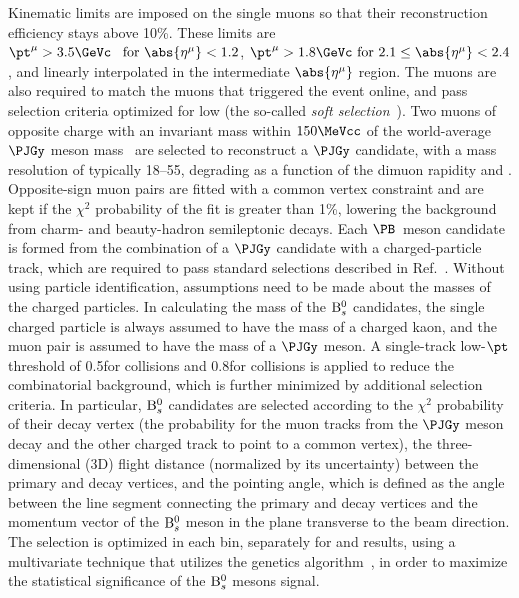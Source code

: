 Kinematic limits are imposed on the single muons so that their reconstruction efficiency stays above 10\%. These limits are $\pt^{\mu}>3.5\GeVc\enspace \text{ for } \abs{\eta^{\mu}}<1.2$, $\pt^{\mu}>1.8\GeVc\text{ for }2.1\le\abs{\eta^{\mu}}<2.4$, 
and linearly interpolated in the intermediate $\abs{\eta^{\mu}}$ region. The muons are also required to match the muons that triggered the event online, and pass selection criteria optimized 
for low \pt (the so-called \textit{soft selection}~\cite{Chatrchyan:2012xi}). Two muons of opposite charge with an invariant mass within $150\MeVcc$ of the world-average $\PJGy$ meson 
mass~\cite{pdg:2016} are selected to reconstruct a $\PJGy$ candidate, with a mass resolution of typically 18--55\MeVcc, degrading as a function of the dimuon rapidity and \pt. 
Opposite-sign muon pairs are fitted with a common vertex constraint and are kept if the $\chi^2$ probability of the fit is greater than 1\%, lowering the background from charm- and beauty-hadron 
semileptonic decays. Each $\PB$~meson candidate is formed from the combination of a $\PJGy$ candidate with a charged-particle track, which are required to pass standard selections 
described in Ref.~\cite{Khachatryan:2016odn}. Without using particle identification, assumptions need to be made about the masses of the charged particles. In calculating the mass of 
the ${\mathrm{B}_{s}^{0}}$ candidates, the single charged particle is always assumed to have the mass of a charged kaon, and the muon pair is assumed to have the mass of a $\PJGy$ meson.
A single-track low-$\pt$ threshold of 0.5\GeVc for \pp collisions and 0.8\GeVc for \PbPb collisions is applied to reduce the combinatorial background, which is further minimized by additional selection criteria.
In particular, ${\mathrm{B}_{s}^{0}}$ candidates are selected according to the $\chi^{2}$ probability of their decay vertex (the probability for the muon tracks from the $\PJGy$ meson decay and the 
other charged track to point to a common vertex), the three-dimensional (3D) flight distance (normalized by its uncertainty) between the primary and decay vertices, and the pointing angle, 
which is defined as the angle between the line segment connecting the primary and decay vertices and the momentum vector of the ${\mathrm{B}_{s}^{0}}$ meson in the plane transverse to 
the beam direction. The selection is optimized in each \pt bin, separately for \pp and \PbPb results, using a multivariate technique that utilizes the genetics algorithm~\cite{Hocker:2007ht}, 
in order to maximize the statistical significance of the ${\mathrm{B}_{s}^{0}}$ mesons signal. 

